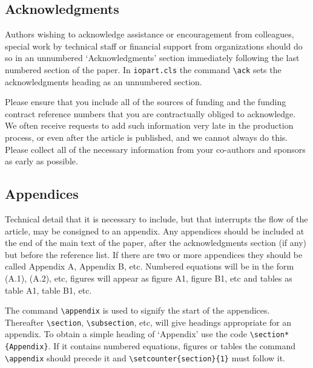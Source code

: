 \documentclass[12pt]{iopart}
\begin{document}
\subsection{Acknowledgments}
Authors wishing to acknowledge assistance or encouragement from 
colleagues, special work by technical staff or financial support from 
organizations should do so in an unnumbered `Acknowledgments' section 
immediately following the last numbered section of the paper. In \verb"iopart.cls" the 
command \verb"\ack" sets the acknowledgments heading as an unnumbered
section.

Please ensure that you include all of the sources of funding and the funding contract reference numbers that you are contractually obliged to acknowledge. We often receive requests to add such information very late in the production process, or even after the article is published, and we cannot always do this. Please collect all of the necessary information from your co-authors and sponsors as early as possible.  

\subsection{Appendices}
Technical detail that it is necessary to include, but that interrupts 
the flow of the article, may be consigned to an appendix. 
Any appendices should be included at the end of the main text of the paper, after the acknowledgments section (if any) but before the reference list.
If there are 
two or more appendices they should be called Appendix A, Appendix B, etc. 
Numbered equations will be in the form (A.1), (A.2), etc,
figures will appear as figure A1, figure B1, etc and tables as table A1,
table B1, etc.

The command \verb"\appendix" is used to signify the start of the
appendices. Thereafter \verb"\section", \verb"\subsection", etc, will 
give headings appropriate for an appendix. To obtain a simple heading of 
`Appendix' use the code \verb"\section*{Appendix}". If it contains
numbered equations, figures or tables the command \verb"\appendix" should
precede it and \verb"\setcounter{section}{1}" must follow it. 
 
\end{document}

